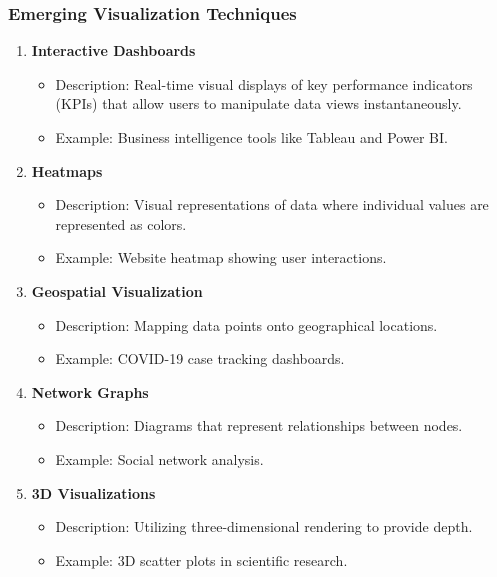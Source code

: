 \documentclass{beamer}
\begin{document}
\begin{frame}[fragile]
    \frametitle{Emerging Visualization Techniques}
    \begin{enumerate}
        \item \textbf{Interactive Dashboards}
            \begin{itemize}
                \item Description: Real-time visual displays of key performance indicators (KPIs) that allow users to manipulate data views instantaneously.
                \item Example: Business intelligence tools like Tableau and Power BI.
            \end{itemize}
        \item \textbf{Heatmaps}
            \begin{itemize}
                \item Description: Visual representations of data where individual values are represented as colors.
                \item Example: Website heatmap showing user interactions.
            \end{itemize}
        \item \textbf{Geospatial Visualization}
            \begin{itemize}
                \item Description: Mapping data points onto geographical locations.
                \item Example: COVID-19 case tracking dashboards.
            \end{itemize}
        \item \textbf{Network Graphs}
            \begin{itemize}
                \item Description: Diagrams that represent relationships between nodes.
                \item Example: Social network analysis.
            \end{itemize}
        \item \textbf{3D Visualizations}
            \begin{itemize}
                \item Description: Utilizing three-dimensional rendering to provide depth.
                \item Example: 3D scatter plots in scientific research.
            \end{itemize}
    \end{enumerate}
\end{frame}
\end{document}
